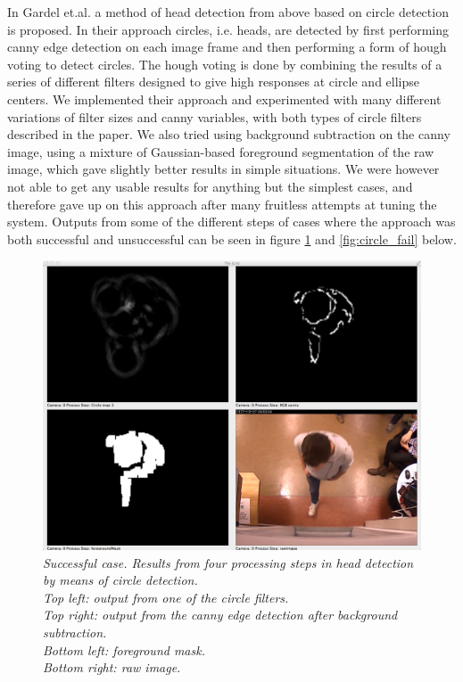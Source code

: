 
In \cite{Gardel} Gardel et.al. a method of head detection from above based on circle detection is proposed. In their approach circles, i.e. heads, are detected by first performing canny edge detection on each image frame and then performing a form of hough voting to detect circles. The hough voting is done by combining the results of a series of different filters designed to give high responses at circle and ellipse centers. We implemented their approach and experimented with many different variations of filter sizes and canny variables, with both types of circle filters described in the paper. We also tried using background subtraction on the canny image, using a mixture of Gaussian-based foreground segmentation \cite{Zivkovic} of the raw image, which gave slightly better results in simple situations. We were however not able to get any usable results for anything but the simplest cases, and therefore gave up on this approach after many fruitless attempts at tuning the system. Outputs from some of the different steps of cases where the approach was both successful and unsuccessful can be seen in figure \ref{fig:circle_success} and \ref{fig:circle_fail} below.
\vspace{1cm}
\begin{figure}[htb]
	\centering
	\includegraphics[width=\linewidth]{images/circle_detection_success.png}
	\caption[An example of a successful Hough-circle detection]{\textit{
	Successful case. Results from four processing steps in head detection by means of circle detection.\\
	Top left: output from one of the circle filters.\\ 
	Top right: output from the canny edge detection after background subtraction.\\ 
	Bottom left: foreground mask.\\ 
	Bottom right: raw image.}}
	\label{fig:circle_success}  %
\end{figure}
